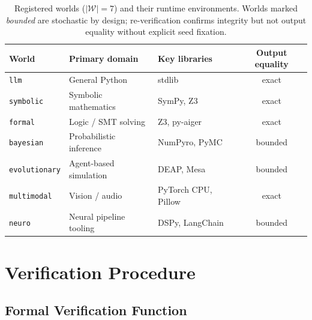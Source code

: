 \documentclass[11pt]{article}
\begin{document}
\begin{table}[h]
\centering
\caption{Registered worlds ($|\mathcal{W}| = 7$) and their runtime environments.
Worlds marked \emph{bounded} are stochastic by design; re-verification
confirms integrity but not output equality without explicit seed fixation.}
\label{tab:worlds}
\begin{tabular}{lllc}
\toprule
\textbf{World} & \textbf{Primary domain} & \textbf{Key libraries}
  & \textbf{Output equality} \\
\midrule
\texttt{llm}          & General Python           & stdlib               & exact \\
\texttt{symbolic}     & Symbolic mathematics     & SymPy, Z3            & exact \\
\texttt{formal}       & Logic / SMT solving      & Z3, py-aiger         & exact \\
\texttt{bayesian}     & Probabilistic inference  & NumPyro, PyMC        & bounded \\
\texttt{evolutionary} & Agent-based simulation   & DEAP, Mesa           & bounded \\
\texttt{multimodal}   & Vision / audio           & PyTorch CPU, Pillow  & exact \\
\texttt{neuro}        & Neural pipeline tooling  & DSPy, LangChain      & bounded \\
\bottomrule
\end{tabular}
\end{table}

\section{Verification Procedure}
\label{sec:verification}

\subsection{Formal Verification Function}
\end{document}
